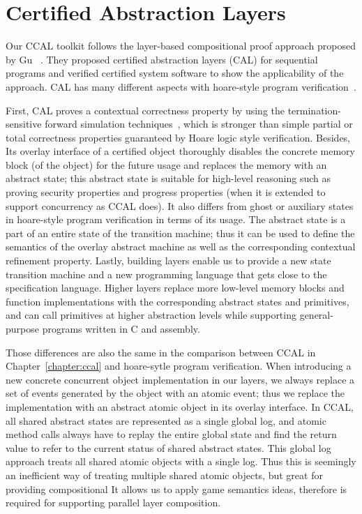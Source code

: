 
\section{Certified Abstraction Layers}
\label{chatper:related:sec:certified-abstraction-laayers}

Our CCAL toolkit follows the layer-based compositional proof approach proposed by Gu \etal~\cite{deepspec}.
They proposed certified abstraction layers (CAL) for sequential programs and 
verified certified system software to show the applicability of the approach.
CAL has many different aspects with
 hoare-style program verification~\cite{hoare69,reynolds02,boogie05,nanevski06}.

First, CAL proves a contextual correctness property by using the termination-sensitive forward simulation 
techniques~\cite{Lynch95,compcert}, 
which is stronger than simple partial or total correctness properties guaranteed by Hoare logic style verification.
Besides, Its overlay interface of a certified object thoroughly disables 
the concrete memory block (of the object)  for the future usage 
and replaces the memory with an abstract state;
this abstract state is suitable for high-level reasoning such as proving security properties and progress properties (when it is extended to support
concurrency as CCAL does). 
It also differs from ghost or auxiliary states in hoare-style program verification in terms of 
its usage.
The abstract state is a part of an entire state of the transition machine; 
thus it can be used to define the semantics of the overlay abstract machine
as well as the corresponding contextual refinement property.
Lastly,  building layers enable us to provide a new state transition machine and a new programming language that gets close to the specification language. 
Higher layers replace more low-level memory blocks and function implementations with 
the corresponding abstract states and primitives,
and can call primitives at higher abstraction levels while  
supporting general-purpose
programs written in C and assembly.

Those differences are also the same in the comparison between CCAL in Chapter~\ref{chapter:ccal} and 
hoare-sytle program verification. 
When introducing a new concrete concurrent object implementation in our layers, 
we always replace a set of events generated by the object with an atomic event; thus we replace the implementation with an abstract atomic object in its overlay interface. 
In CCAL, 
all shared abstract states are represented as a single global log,
and atomic method calls always have to 
replay the entire global state and find the return value to refer to the current status of shared abstract states.
This global log approach treats all shared atomic objects with a single log.
Thus this  is seemingly an inefficient way of treating multiple shared atomic objects,
but great for providing compositional 
It allows us to apply game semantics ideas, therefore
is required for supporting parallel layer composition.




